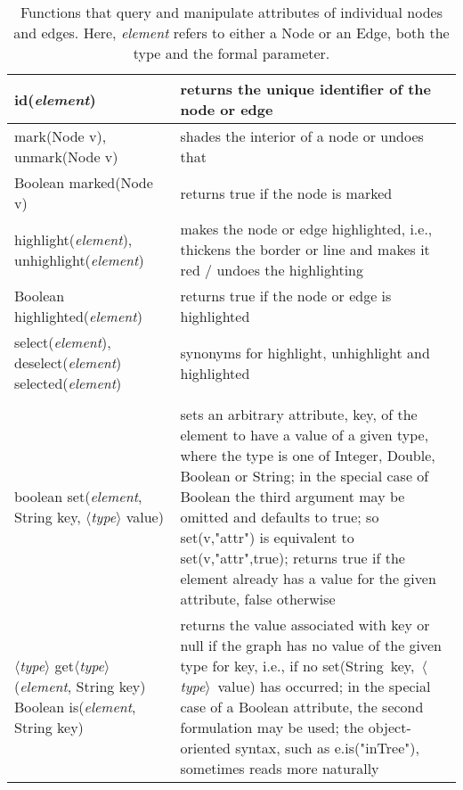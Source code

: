 \begin{table}
  \small
  \centering
  \begin{tabular}{| m{} | m{} |}
    \hline
    \textsf{id(\emph{element})}
    &
    returns the unique identifier of the node or edge
    \\ \hline
    \textsf{mark(Node v), unmark(Node v)}
    &
    shades the interior of a node or undoes that
    \\ \hline
    \textsf{Boolean marked(Node v)}
    &
    returns \textsf{true} if the node is marked
    \\ \hline
    \textsf{highlight(\emph{element}), unhighlight(\emph{element})}
    &
    makes the node or edge highlighted, i.e.,
    thickens the border or line and makes it red / undoes the highlighting
    \\ \hline
    \textsf{Boolean highlighted(\emph{element})}
    &
    returns \textsf{true} if the node or edge is highlighted
    \\ \hline
    \shortstack[l]{
      \textsf{select(\emph{element})}, \textsf{deselect(\emph{element})}\\
      \textsf{selected(\emph{element})}
    }
    &
    synonyms for \textsf{highlight}, \textsf{unhighlight} and \textsf{highlighted}
    \\ \hline
    &
    \\ \hline
    \textsf{boolean set(\emph{element}, String key, $\langle$\emph{type}$\rangle$ value)}
    &
    sets an arbitrary attribute, \textsf{key}, of the element to have a value of a given type, where
    the type is one of \textsf{Integer}, \textsf{Double}, \textsf{Boolean}
    or \textsf{String};
    in the special case of \textsf{Boolean} the third argument may be omitted
    and defaults to \textsf{true};
    so \textsf{set(v,"attr")} is equivalent to \textsf{set(v,"attr",true)};
    returns \textsf{true} if the element already has a value for the given attribute,
    \textsf{false} otherwise
    \\ \hline
    \shortstack[l]{
    \textsf{$\langle$\emph{type}$\rangle$ get$\langle$\emph{type}$\rangle$(\emph{element}, String key)}\\
    \textsf{Boolean is(\emph{element}, String key)}
    }
    &
    returns the value associated with \textsf{key} or \textsf{null}
    if the graph has no value of the given type for \textsf{key}, i.e.,
    if no
    \textsf{set(String~key,~$\langle$\emph{type}$\rangle$~value)} has occurred;
    in the special case of a \textsf{Boolean} attribute, the second formulation
    may be used;
    the object-oriented syntax, such as \textsf{e.is("inTree")}, sometimes
    reads more naturally
    \\ \hline
  \end{tabular}

  \caption{Functions that query and manipulate attributes of individual
    nodes and edges.
    Here, \emph{element} refers to either a \textsf{Node} or an \textsf{Edge},
    both the type and the formal parameter.
  }
  \label{tab:graph_element_functions}
\end{table}
